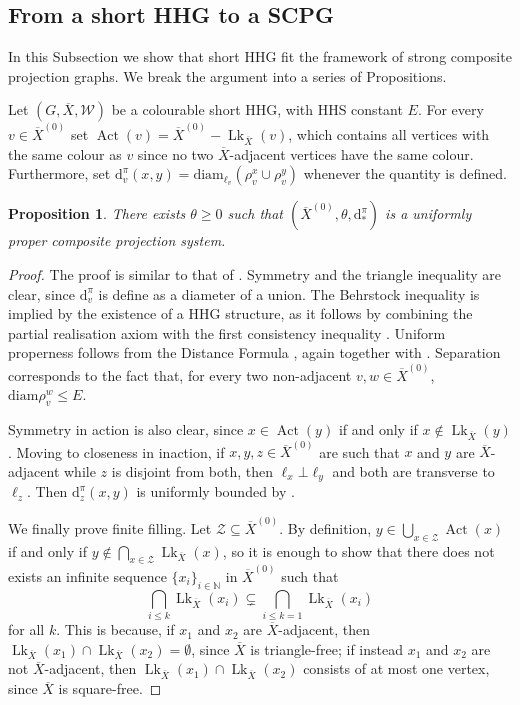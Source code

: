 \documentclass[svgnames]{amsart}
\theoremstyle{plain}
\newtheorem{prop}[thm]{Proposition}
\theoremstyle{definition}
\newcommand{\diam}{\mathrm{diam}}
\newcommand{\ov}[1]{\overline{#1}}
\newcommand{\dist}{\mathrm{d}}
\newcommand{\orth}{\bot}
\newcommand{\link}{\operatorname{Lk}}
\newcommand{\Act}{\operatorname{Act}}
\newcommand{\W}{\mathcal{W}}
\begin{document}
\subsection{From a short HHG to a SCPG}\label{rem:Short_is_SCPG}
In this Subsection we show that short HHG fit the framework of strong composite projection graphs. We break the argument into a series of Propositions.

Let $(G, \ov{X},\W)$ be a colourable short HHG, with HHS constant $E$. For every $v\in \ov{X}^{(0)}$ set $\Act(v)=\ov{X}^{(0)}-\link_{\ov{X}}(v)$, which contains all vertices with the same colour as $v$ since no two $\ov X$-adjacent vertices have the same colour. Furthermore, set $\dist^\pi_v(x,y)=\diam_{\ell_v}(\rho^x_v\cup\rho^y_v)$ whenever the quantity is defined. 

\begin{prop}
    There exists $\theta\ge 0$ such that $(\ov{X}^{(0)}, \theta, \dist^\pi_*)$ is a uniformly proper composite projection system.
\end{prop}

\begin{proof}
     The proof is similar to that of \cite[Lemma 8.21]{BHMS}. Symmetry and the triangle inequality are clear, since $\dist^\pi_v$ is define as a diameter of a union. The Behrstock inequality is implied by the existence of a HHG structure, as it follows by combining the partial realisation axiom \cite[Definition 1.1.(8)]{HHS_II} with the first consistency inequality \cite[Definition 1.1.(4)]{HHS_II}. Uniform properness follows from the Distance Formula \cite[Theorem~4.5]{HHS_II}, again together with \cite[Definition 1.1.(8)]{HHS_II}. Separation corresponds to the fact that, for every two non-adjacent $v,w\in \ov X^{(0)}$, $\diam\rho^w_v\le E$. 

    Symmetry in action is also clear, since $x\in\Act(y)$ if and only if $x\not \in \link_{\ov X}(y)$. Moving to closeness in inaction, if $x,y,z\in \ov X^{(0)}$ are such that $x$ and $y$ are $\ov X$-adjacent while $z$ is disjoint from both, then $\ell_x\orth\ell_y$ and both are transverse to $\ell_z$. Then $\dist^\pi_z(x,y)$ is uniformly bounded by \cite[Lemma 1.5]{DHS}.

    We finally prove finite filling. Let $\mathcal Z\subseteq \ov X^{(0)}$. By definition, $y\in \bigcup_{x\in \mathcal Z}\Act(x)$ if and only if $y\not \in \bigcap_{x\in \mathcal Z}\link_{\ov X}(x)$, so it is enough to show that there does not exists an infinite sequence $\{x_i\}_{i\in \mathbb{N}}$ in $ \ov X^{(0)}$ such that $$\bigcap_{i\le k}\link_{\ov X}(x_i)\subsetneq \bigcap_{i\le k=1}\link_{\ov X}(x_i)$$ for all $k$. This is because, if $x_1$ and $x_2$ are $\ov X$-adjacent, then $\link_{\ov X}(x_1)\cap \link_{\ov X}(x_2)=\emptyset$, since $\ov X$ is triangle-free; if instead $x_1$ and $x_2$ are not $\ov X$-adjacent, then $\link_{\ov X}(x_1)\cap \link_{\ov X}(x_2)$ consists of at most one vertex, since $\ov X$ is square-free. 
\end{proof}
\end{document}
